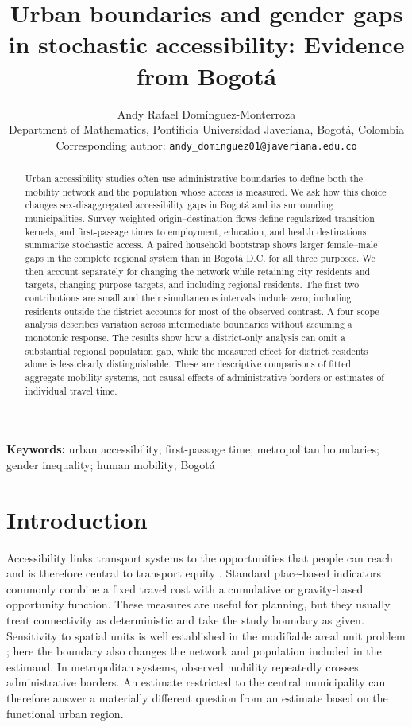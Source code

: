 \documentclass[11pt]{article}
\title{Urban boundaries and gender gaps in stochastic accessibility: Evidence from Bogotá}
\author{Andy Rafael Domínguez-Monterroza\\
Department of Mathematics, Pontificia Universidad Javeriana, Bogotá, Colombia\\
Corresponding author: \texttt{andy\_dominguez01@javeriana.edu.co}}
\date{}
\begin{document}
\maketitle

\begin{abstract}
Urban accessibility studies often use administrative boundaries to define both the mobility network and the population whose access is measured. We ask how this choice changes sex-disaggregated accessibility gaps in Bogotá and its surrounding municipalities. Survey-weighted origin--destination flows define regularized transition kernels, and first-passage times to employment, education, and health destinations summarize stochastic access. A paired household bootstrap shows larger female--male gaps in the complete regional system than in Bogotá D.C. for all three purposes. We then account separately for changing the network while retaining city residents and targets, changing purpose targets, and including regional residents. The first two contributions are small and their simultaneous intervals include zero; including residents outside the district accounts for most of the observed contrast. A four-scope analysis describes variation across intermediate boundaries without assuming a monotonic response. The results show how a district-only analysis can omit a substantial regional population gap, while the measured effect for district residents alone is less clearly distinguishable. These are descriptive comparisons of fitted aggregate mobility systems, not causal effects of administrative borders or estimates of individual travel time.
\end{abstract}

\noindent\textbf{Keywords:} urban accessibility; first-passage time; metropolitan boundaries; gender inequality; human mobility; Bogotá

\section{Introduction}
Accessibility links transport systems to the opportunities that people can reach and is therefore central to transport equity \citep{hansen1959,pereira2017}. Standard place-based indicators commonly combine a fixed travel cost with a cumulative or gravity-based opportunity function. These measures are useful for planning, but they usually treat connectivity as deterministic and take the study boundary as given. Sensitivity to spatial units is well established in the modifiable areal unit problem \citep{openshaw1983,fotheringham1991}; here the boundary also changes the network and population included in the estimand. In metropolitan systems, observed mobility repeatedly crosses administrative borders. An estimate restricted to the central municipality can therefore answer a materially different question from an estimate based on the functional urban region.
\end{document}
